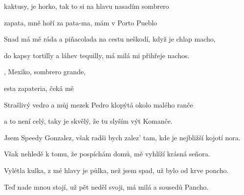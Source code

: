 

\zs
{} kaktusy, je horko, tak to si na hlavu nasadím sombrero 

 zapata, mně hoří za pata-ma, mám v Porto Pueblo 
\ks

\zs
Snad má mě ráda a piñacolada na cestu neškodí, když je chlap macho,

do kapsy tortilly a láhev tequilly, má milá mi přihřeje nachos.
\ks

\zr
{}, Mexiko, sombrero grande, 

 esta zapateria, čeká mě 
\kr

\zs
Strašlivý vedro a můj mezek Pedro klopýtá okolo malého ranče

a to není celý, taky je skvělý, že tu slyším výt Komanče.
\ks

\zs
Jsem Speedy Gonzalez, však radši bych zalez' tam, kde je nejbližší kojotí nora.

Však nehledě k tomu, že pospíchám domů, mě vyhlíží krásná señora.
\ks

\zr  \kr

\zs
Vylétla kulka, z mé hlavy je půlka, než jsem spad, už bylo od krve poncho.

Teď nade mnou stojí, už pět neděl svoji, má milá a sousedů Pancho.
\ks

\zr  \kr

\kp
